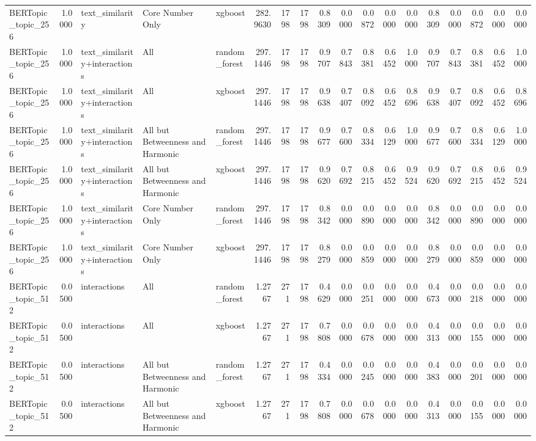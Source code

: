 \begin{tabular}{lrlllrrrrrrrrrrrrr}
BERTopic_topic_256 & 1.0000 & text_similarity & Core Number Only & xgboost & 282.9630 & 1798 & 1798 & 0.8309 & 0.0000 & 0.0872 & 0.0000 & 0.0000 & 0.8309 & 0.0000 & 0.0872 & 0.0000 & 0.0000 \\
BERTopic_topic_256 & 1.0000 & text_similarity+interactions & All & random_forest & 297.1446 & 1798 & 1798 & 0.9707 & 0.7843 & 0.8381 & 0.6452 & 1.0000 & 0.9707 & 0.7843 & 0.8381 & 0.6452 & 1.0000 \\
BERTopic_topic_256 & 1.0000 & text_similarity+interactions & All & xgboost & 297.1446 & 1798 & 1798 & 0.9638 & 0.7407 & 0.8092 & 0.6452 & 0.8696 & 0.9638 & 0.7407 & 0.8092 & 0.6452 & 0.8696 \\
BERTopic_topic_256 & 1.0000 & text_similarity+interactions & All but Betweenness and Harmonic & random_forest & 297.1446 & 1798 & 1798 & 0.9677 & 0.7600 & 0.8334 & 0.6129 & 1.0000 & 0.9677 & 0.7600 & 0.8334 & 0.6129 & 1.0000 \\
BERTopic_topic_256 & 1.0000 & text_similarity+interactions & All but Betweenness and Harmonic & xgboost & 297.1446 & 1798 & 1798 & 0.9620 & 0.7692 & 0.8215 & 0.6452 & 0.9524 & 0.9620 & 0.7692 & 0.8215 & 0.6452 & 0.9524 \\
BERTopic_topic_256 & 1.0000 & text_similarity+interactions & Core Number Only & random_forest & 297.1446 & 1798 & 1798 & 0.8342 & 0.0000 & 0.0890 & 0.0000 & 0.0000 & 0.8342 & 0.0000 & 0.0890 & 0.0000 & 0.0000 \\
BERTopic_topic_256 & 1.0000 & text_similarity+interactions & Core Number Only & xgboost & 297.1446 & 1798 & 1798 & 0.8279 & 0.0000 & 0.0859 & 0.0000 & 0.0000 & 0.8279 & 0.0000 & 0.0859 & 0.0000 & 0.0000 \\
BERTopic_topic_512 & 0.0500 & interactions & All & random_forest & 1.2767 & 271 & 1798 & 0.4629 & 0.0000 & 0.0251 & 0.0000 & 0.0000 & 0.4673 & 0.0000 & 0.0218 & 0.0000 & 0.0000 \\
BERTopic_topic_512 & 0.0500 & interactions & All & xgboost & 1.2767 & 271 & 1798 & 0.7808 & 0.0000 & 0.0678 & 0.0000 & 0.0000 & 0.4313 & 0.0000 & 0.0155 & 0.0000 & 0.0000 \\
BERTopic_topic_512 & 0.0500 & interactions & All but Betweenness and Harmonic & random_forest & 1.2767 & 271 & 1798 & 0.4334 & 0.0000 & 0.0245 & 0.0000 & 0.0000 & 0.4383 & 0.0000 & 0.0201 & 0.0000 & 0.0000 \\
BERTopic_topic_512 & 0.0500 & interactions & All but Betweenness and Harmonic & xgboost & 1.2767 & 271 & 1798 & 0.7808 & 0.0000 & 0.0678 & 0.0000 & 0.0000 & 0.4313 & 0.0000 & 0.0155 & 0.0000 & 0.0000 \\

\end{tabular}
